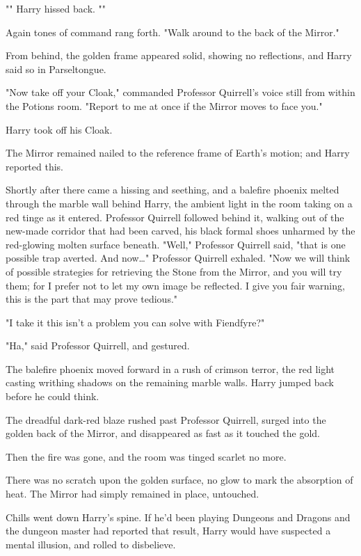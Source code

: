 "" Harry hissed back. ""

Again tones of command rang forth. "Walk around to the back of the Mirror."

From behind, the golden frame appeared solid, showing no reflections, and Harry 
said so in Parseltongue.

"Now take off your Cloak," commanded Professor Quirrell's voice still from 
within the Potions room. "Report to me at once if the Mirror moves to face you."

Harry took off his Cloak.

The Mirror remained nailed to the reference frame of Earth's motion; and Harry 
reported this.

Shortly after there came a hissing and seething, and a balefire phoenix melted 
through the marble wall behind Harry, the ambient light in the room taking on a 
red tinge as it entered. Professor Quirrell followed behind it, walking out of 
the new-made corridor that had been carved, his black formal shoes unharmed by 
the red-glowing molten surface beneath. "Well," Professor Quirrell said, "that 
is one possible trap averted. And now{\ldots}" Professor Quirrell exhaled. "Now 
we will think of possible strategies for retrieving the Stone from the Mirror, 
and you will try them; for I prefer not to let my own image be reflected. I 
give you fair warning, this is the part that may prove tedious."

"I take it this isn't a problem you can solve with Fiendfyre?"

"Ha," said Professor Quirrell, and gestured.

The balefire phoenix moved forward in a rush of crimson terror, the red light 
casting writhing shadows on the remaining marble walls. Harry jumped back 
before he could think.

The dreadful dark-red blaze rushed past Professor Quirrell, surged into the 
golden back of the Mirror, and disappeared as fast as it touched the gold.

Then the fire was gone, and the room was tinged scarlet no more.

There was no scratch upon the golden surface, no glow to mark the absorption of 
heat. The Mirror had simply remained in place, untouched.

Chills went down Harry's spine. If he'd been playing Dungeons and Dragons and 
the dungeon master had reported that result, Harry would have suspected a 
mental illusion, and rolled to disbelieve.

